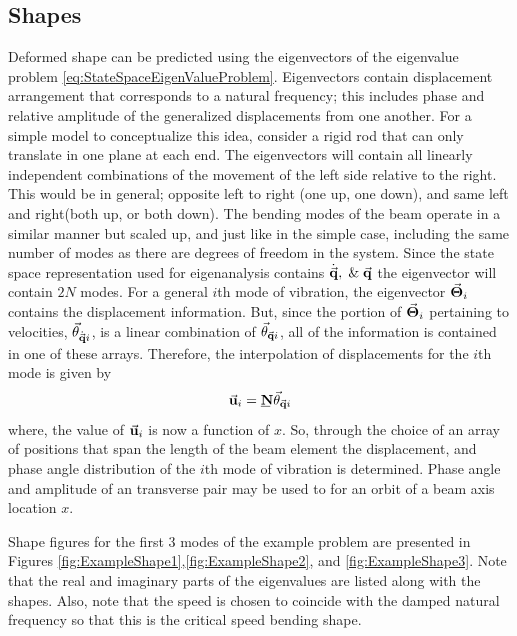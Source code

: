 \subsection{Shapes}
Deformed shape can be predicted using the eigenvectors of the eigenvalue problem \ref{eq:StateSpaceEigenValueProblem}. Eigenvectors contain displacement arrangement that corresponds to a natural frequency; this includes phase and relative amplitude of the generalized displacements from one another. For a simple model to conceptualize this idea, consider a rigid rod that can only translate in one plane at each end. The eigenvectors will contain all linearly independent combinations of the movement of the left side relative to the right. This would be in general; opposite left to right (one up, one down), and same left and right(both up, or both down). The bending modes of the beam operate in a similar manner but scaled up, and just like in the simple case, including the same number of modes as there are degrees of freedom in the system. Since the state space representation used for eigenanalysis contains $ \dot{\vec{\mathbf{q}}},\; \& \;\vec{\mathbf{q}} $ the eigenvector will contain $ 2N $ modes. For a general $ i $th mode of vibration, the eigenvector $ \vec{\mathbf{\Theta}}_i $ contains the displacement information. But, since the portion of $ \vec{\mathbf{\Theta}}_i $ pertaining to velocities, $ \vec{\mathbf{\theta}}_{\dot{\vec{\mathbf{q}}}i} $, is a linear combination of $ \vec{\mathbf{\theta}}_{\vec{\mathbf{q}}i} $, all of the information is contained in one of these arrays. Therefore, the interpolation of displacements for the $ i $th mode is given by
	\begin{equation}
	\vect{u}_i=\mat{N}\vect{\theta}_{\vect{q}i}
	\end{equation}
where, the value of $ \vec{\mathbf{u}}_i $ is now a function of $ x $. So, through the choice of an array of positions that span the length of the beam element the displacement, and phase angle distribution of the $ i $th mode of vibration is determined. Phase angle and amplitude of an transverse pair may be used to for an orbit of a beam axis location $ x $.\par
Shape figures for the first 3 modes of the example problem are presented in Figures \ref{fig:ExampleShape1},\ref{fig:ExampleShape2}, and \ref{fig:ExampleShape3}. Note that the real and imaginary parts of the eigenvalues are listed along with the shapes. Also, note that the speed is chosen to coincide with the damped natural frequency so that this is the critical speed bending shape.
